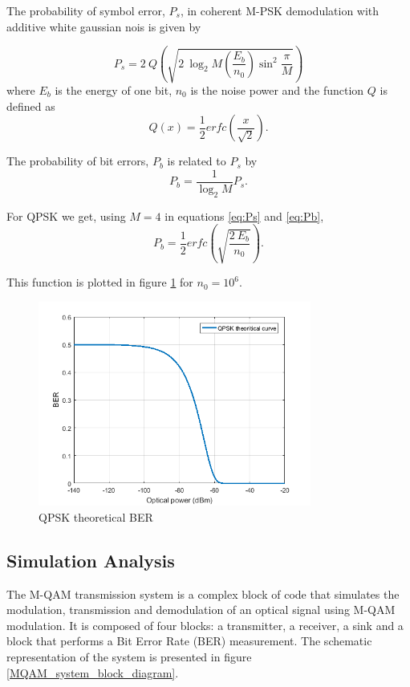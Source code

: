 The probability of symbol error, $P_s$, in coherent M-PSK demodulation with additive white gaussian nois is given by 

\begin{equation}
	P_s=2~Q\left(\sqrt{2~\log_2 M \left(\frac{E_b}{n_0}\right)\sin^2\frac{\pi}{M}}\right)
\end{equation}
where $E_b$ is the energy of one bit, $n_0$ is the noise power and the function $Q$ is defined as
\begin{equation}
	Q(x)=\frac{1}{2} erfc\left(\frac{x}{\sqrt{2}}\right).
	\label{eq:Ps}
\end{equation}

The probability of bit errors, $P_b$ is related to $P_s$ by
\begin{equation}
	P_b=\frac{1}{\log_2 M}P_s.
	\label{eq:Pb}
\end{equation} 

For QPSK we get, using $M=4$ in equations \ref{eq:Ps} and \ref{eq:Pb},
\begin{equation}
	P_b=\frac{1}{2} erfc\left(\sqrt{\frac{2~E_b}{n_0}}\right).
\end{equation}

This function is plotted in figure \ref{fig:QPSK_th_curve} for $n_0=10^6$.

\begin{figure}
		\centering
		\includegraphics[width=0.8\textwidth]{./figures/QPSK_th_curve}
		\caption{QPSK theoretical BER}
		\label{fig:QPSK_th_curve}
\end{figure}
\subsection{Simulation Analysis}

The M-QAM transmission system is a complex block of code that simulates the modulation, transmission and
demodulation of an optical signal using M-QAM modulation.
It is composed of four blocks: a transmitter, a receiver, a sink and a block that performs a Bit Error Rate (BER) measurement. The schematic representation of the
system is presented in figure \ref{MQAM_system_block_diagram}. 

